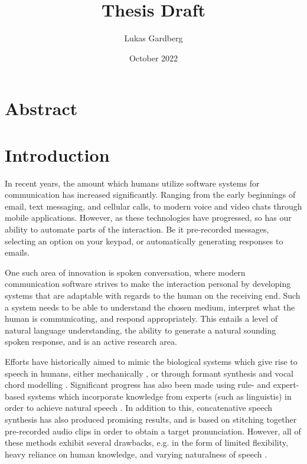 \documentclass{article}
\title{Thesis Draft}
\author{Lukas Gardberg}
\date{October 2022}
\begin{document}
\maketitle

\newpage

\section{Abstract}

\newpage

\tableofcontents

\newpage

\section{Introduction}


In recent years, the amount which humans utilize software systems for communication has increased significantly. Ranging from the early beginnings of email, text messaging, and cellular calls, to modern voice and video chats through mobile applications. However, as these technologies have progressed, so has our ability to automate parts of the interaction. Be it pre-recorded messages, selecting an option on your keypad, or automatically generating responses to emails.

One such area of innovation is spoken conversation, where modern communication software strives to make the interaction personal by developing systems that are adaptable with regards to the human on the receiving end. Such a system needs to be able to understand the chosen medium, interpret what the human is communicating, and respond appropriately. This entails a level of natural language understanding, the ability to generate a natural sounding spoken response, and is an active research area.

Efforts have historically aimed to mimic the biological systems which give rise to speech in humans, either mechanically \cite{von1791mechanismus}, or through formant synthesis and vocal chord modelling \cite{fant1970acoustic}. Significant progress has also been made using rule- and expert-based systems which incorporate knowledge from experts (such as linguistis) in order to achieve natural speech \cite{klatt1980software}. In addition to this, concatenative speech synthesis has also produced promising results, and is based on stitching together pre-recorded audio clips in order to obtain a target pronunciation. However, all of these methods exhibit several drawbacks, e.g. in the form of limited flexibility, heavy reliance on human knowledge, and varying naturalness of speech \cite{tan2021survey}.
\end{document}
